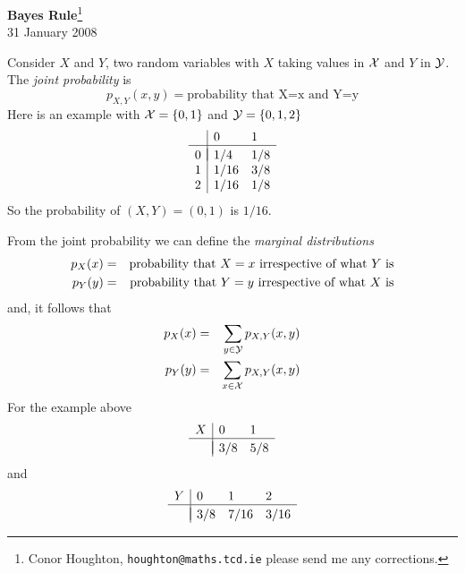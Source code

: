 \documentclass[12pt]{article}
\begin{document}
\begin{center}{\Large
{\bf Bayes Rule}\footnote{Conor Houghton, {\tt houghton@maths.tcd.ie} please
send me any corrections.}}\\[1cm] 31 January 2008\\[1cm]
\end{center}

Consider $X$ and $Y$, two random variables with $X$ taking values in ${\cal X}$ and $Y$ in ${\cal
  Y}$. The {\sl joint probability} is
\begin{equation}
p_{X,Y}(x,y)=\mbox{probability that X=x and Y=y}
\end{equation}
Here is an example with ${\cal X}=\{0,1\}$ and ${\cal Y}=\{0,1,2\}$
\begin{equation}
\begin{array}{l|ll}
&0&1\\
\hline\\[-10pt]
0&1/4&1/8\\
1&1/16&3/8\\
2&1/16&1/8
\end{array}
\end{equation}
So the probability of $(X,Y)=(0,1)$ is $1/16$.

From the joint probability we can define the {\sl marginal distributions}
\begin{eqnarray}
p_{X}(x)&=&\mbox{probability that $X=x$ irrespective of what $Y$ is}\cr
p_{Y}(y)&=&\mbox{probability that $Y=y$ irrespective of what $X$ is}
\end{eqnarray}
and, it follows that
\begin{eqnarray}
p_{X}(x)&=&\sum_{y\in{\cal Y}}p_{X,Y}(x,y)\cr
p_{Y}(y)&=&\sum_{x\in{\cal X}}p_{X,Y}(x,y)
\end{eqnarray}
For the example above
\begin{equation}
\begin{array}{l|ll}
X&0&1\\
\hline\\[-10pt]
 &3/8&5/8
\end{array}
\end{equation}
and
\begin{equation}
\begin{array}{l|lll}
Y&0&1&2\\
\hline\\[-10pt]
&3/8&7/16&3/16
\end{array}
\end{equation}
\end{document}
